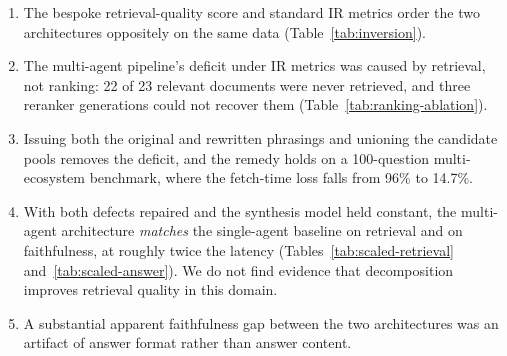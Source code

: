 \begin{enumerate}
  \item The bespoke retrieval-quality score and standard IR metrics order the
  two architectures oppositely on the same data (Table~\ref{tab:inversion}).
  \item The multi-agent pipeline's deficit under IR metrics was caused by
  retrieval, not ranking: 22 of 23 relevant documents were never retrieved,
  and three reranker generations could not recover them
  (Table~\ref{tab:ranking-ablation}).
  \item Issuing both the original and rewritten phrasings and unioning the
  candidate pools removes the deficit, and the remedy holds on a
  100-question multi-ecosystem benchmark, where the fetch-time loss falls from
  96\% to 14.7\%.
  \item With both defects repaired and the synthesis model held constant, the
  multi-agent architecture \emph{matches} the single-agent baseline on retrieval
  and on faithfulness, at roughly twice the latency
  (Tables~\ref{tab:scaled-retrieval} and~\ref{tab:scaled-answer}). We do not
  find evidence that decomposition improves retrieval quality in this domain.
  \item A substantial apparent faithfulness gap between the two architectures
  was an artifact of answer format rather than answer content.
\end{enumerate}
